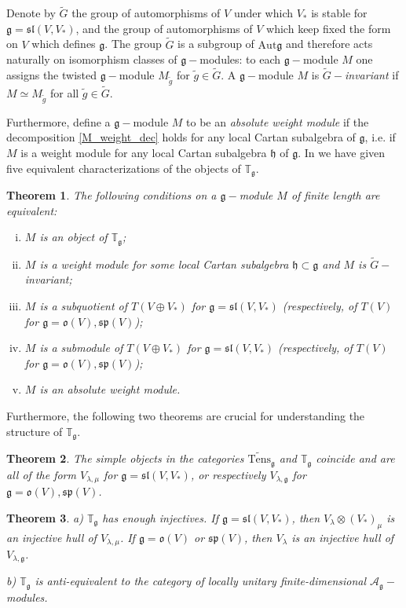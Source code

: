 \documentclass{svmult}
\newtheorem{theo}{Theorem}[section]
\newcommand{\TT}{\mathbb{T}}
\renewcommand{\sp}{\mathfrak{sp}}
\renewcommand{\sl}{\mathfrak{sl}}
\newcommand{\oo}{\mathfrak{o}}
\newcommand{\hh}{\mathfrak{h}}
\renewcommand{\gg}{\mathfrak{g}}
\begin{document}
Denote by $\tilde{G}$ the group of automorphisms of $V$ under which $V_*$ is stable for $\gg = \sl(V,V_*)$, and the group of automorphisms of $V$ which keep fixed the form on $V$ which defines $\gg$. The group $\tilde{G}$ is a subgroup of $\mathrm{Aut}\gg$ and therefore acts naturally on isomorphism classes of $\gg-$modules: to each $\gg-$module $M$ one assigns the twisted $\gg-$module $M_{\tilde{g}}$ for $\tilde{g} \in \tilde{G}$. A $\gg-$module $M$ is \textit{$\tilde{G}-$invariant} if $M \simeq M_{\tilde{g}}$ for all $\tilde{g} \in \tilde{G}$. 

Furthermore, define a $\gg-$module $M$ to be an \textit{absolute weight module} if the decomposition \ref{M_weight_dec} holds for any local Cartan subalgebra of $\gg$, i.e. if $M$ is a weight module for any local Cartan subalgebra $\hh$ of $\gg$. In \cite{DPS} we have given five equivalent characterizations of the objects of $\TT_{\gg}$.

\begin{theo}\label{th:6.1}\cite{DPS} The following conditions on a $\gg-$module $M$ of finite length are equivalent:
\begin{enumerate}[i)]
 \item $M$ is an object of $\TT_{\gg}$;
 \item $M$ is a weight module for some local Cartan subalgebra $\hh \subset \gg$ and $M$ is $\tilde{G}-$invariant;
 \item $M$ is a subquotient of $T(V\oplus V_*)$ for $\gg = \sl(V,V_*)$ (respectively, of $T(V)$ for $\gg = \oo(V), \sp(V)$);
 \item $M$ is a submodule of $T(V\oplus V_*)$ for $\gg = \sl(V,V_*)$ (respectively, of $T(V)$ for $\gg = \oo(V), \sp(V)$);
 \item $M$ is an absolute weight module.
\end{enumerate}
\end{theo}

Furthermore, the following two theorems are crucial for understanding the structure of $\TT_\gg$.

\begin{theo}\label{kos1} \cite{ps} \cite{DPS} 
   The simple objects in the categories $\widetilde{\mathrm{Tens}}_{\gg}$ and $\TT_{\gg}$ coincide and are all of the form $V_{\lambda,\mu}$ for $\gg = \sl(V,V_*)$, 
or respectively $V_{\lambda,\gg}$ for $\gg=\oo(V), \sp(V)$.
\end{theo}

\begin{theo}\label{kos2}\cite{DPS} a) $\TT_{\gg}$ has enough injectives. If $\gg=\sl(V,V_*)$, then $V_\lambda\otimes (V_*)_\mu$ is an injective hull of
$V_{\lambda,\mu}$.  If $\gg=\oo(V)$ or $\sp(V)$, then $V_\lambda$ is an injective hull of $V_{\lambda,\gg}$.

b) $\TT_{\gg}$ is anti-equivalent to the category of locally unitary finite-dimensional $\mathcal{A}_\gg-$modules.
\end{theo}
\end{document}
